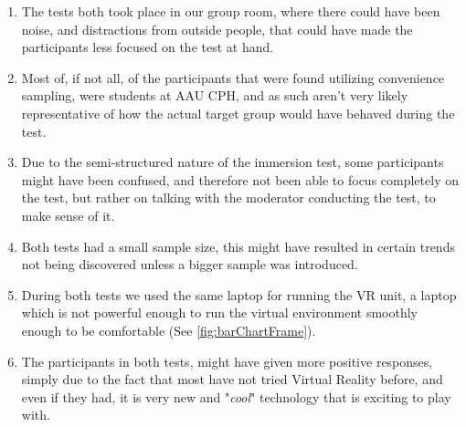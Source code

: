 	\begin{enumerate}
		\item The tests both took place in our group room, where there could have been noise, and distractions from outside people, that could have made the participants less focused on the test at hand.\\
		
		\item Most of, if not all, of the participants that were found utilizing convenience sampling, were students at AAU CPH, and as such aren't very likely representative of how the actual target group would have behaved during the test.\\
		
		\item Due to the semi-structured nature of the immersion test, some participants might have been confused, and therefore not been able to focus completely on the test, but rather on talking with the moderator conducting the test, to make sense of it.\\
		
		\item Both tests had a small sample size, this might have resulted in certain trends not being discovered unless a bigger sample was introduced.\\
		
		\item During both tests we used the same laptop for running the VR unit, a laptop which is not powerful enough to run the virtual environment smoothly enough to be comfortable (See \autoref{fig:barChartFrame}).\\
		
		\item The participants in both tests, might have given more positive responses, simply due to the fact that most have not tried Virtual Reality before, and even if they had, it is very new and "\textit{cool}" technology that is exciting to play with.
		
	\end{enumerate}

